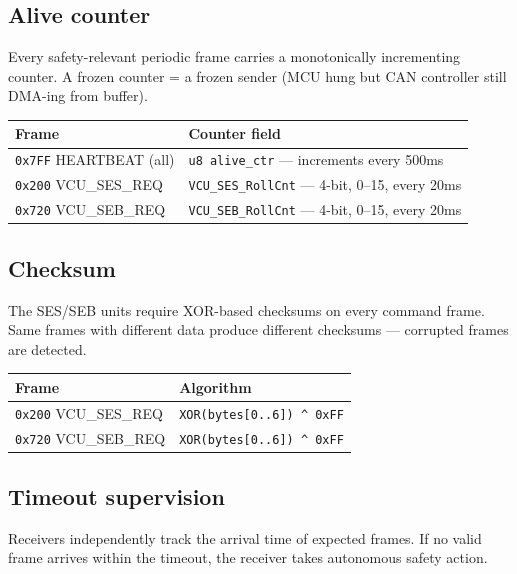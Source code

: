 \documentclass[12pt,a4paper,oneside]{report}
\begin{document}
\subsection{Alive counter}\label{alive-counter}

Every safety-relevant periodic frame carries a monotonically incrementing
counter. A frozen counter = a frozen sender (MCU hung but CAN controller still
DMA-ing from buffer).

\begin{longtable}[]{@{}ll@{}}
\toprule\noalign{}
Frame & Counter field \\
\midrule\noalign{}
\endhead
\bottomrule\noalign{}
\endlastfoot
\texttt{0x7FF} HEARTBEAT (all) & \texttt{u8\ alive\_ctr} --- increments every
500ms \\
\texttt{0x200} VCU\_SES\_REQ & \texttt{VCU\_SES\_RollCnt} --- 4-bit, 0--15,
every 20ms \\
\texttt{0x720} VCU\_SEB\_REQ & \texttt{VCU\_SEB\_RollCnt} --- 4-bit, 0--15,
every 20ms \\
\end{longtable}

\subsection{Checksum}\label{checksum}

The SES/SEB units require XOR-based checksums on every command frame. Same
frames with different data produce different checksums --- corrupted frames are
detected.

\begin{longtable}[]{@{}ll@{}}
\toprule\noalign{}
Frame & Algorithm \\
\midrule\noalign{}
\endhead
\bottomrule\noalign{}
\endlastfoot
\texttt{0x200} VCU\_SES\_REQ & \texttt{XOR(bytes{[}0..6{]})\ \^{}\ 0xFF} \\
\texttt{0x720} VCU\_SEB\_REQ & \texttt{XOR(bytes{[}0..6{]})\ \^{}\ 0xFF} \\
\end{longtable}

\subsection{Timeout supervision}\label{timeout-supervision}

Receivers independently track the arrival time of expected frames. If no valid
frame arrives within the timeout, the receiver takes autonomous safety action.
\end{document}
